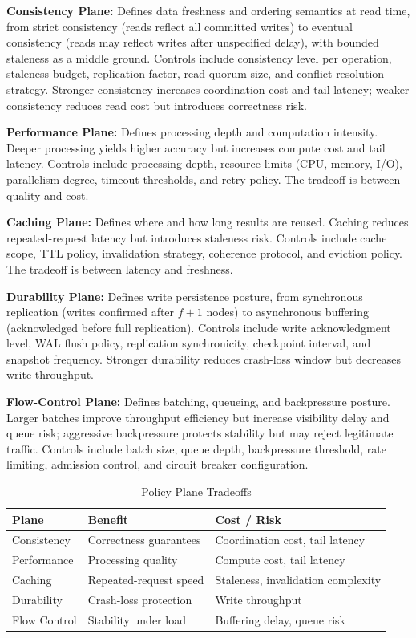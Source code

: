 \documentclass[conference]{IEEEtran}
\begin{document}
\textbf{Consistency Plane:} Defines data freshness and ordering semantics at read time, from strict consistency (reads reflect all committed writes) to eventual consistency (reads may reflect writes after unspecified delay), with bounded staleness as a middle ground. Controls include consistency level per operation, staleness budget, replication factor, read quorum size, and conflict resolution strategy. Stronger consistency increases coordination cost and tail latency; weaker consistency reduces read cost but introduces correctness risk.

\textbf{Performance Plane:} Defines processing depth and computation intensity. Deeper processing yields higher accuracy but increases compute cost and tail latency. Controls include processing depth, resource limits (CPU, memory, I/O), parallelism degree, timeout thresholds, and retry policy. The tradeoff is between quality and cost.

\textbf{Caching Plane:} Defines where and how long results are reused. Caching reduces repeated-request latency but introduces staleness risk. Controls include cache scope, TTL policy, invalidation strategy, coherence protocol, and eviction policy. The tradeoff is between latency and freshness.

\textbf{Durability Plane:} Defines write persistence posture, from synchronous replication (writes confirmed after $f+1$ nodes) to asynchronous buffering (acknowledged before full replication). Controls include write acknowledgment level, WAL flush policy, replication synchronicity, checkpoint interval, and snapshot frequency. Stronger durability reduces crash-loss window but decreases write throughput.

\textbf{Flow-Control Plane:} Defines batching, queueing, and backpressure posture. Larger batches improve throughput efficiency but increase visibility delay and queue risk; aggressive backpressure protects stability but may reject legitimate traffic. Controls include batch size, queue depth, backpressure threshold, rate limiting, admission control, and circuit breaker configuration.

\begin{table}[t]
\caption{Policy Plane Tradeoffs}
\label{tab:planes}
\centering
\small
\begin{tabular}{@{}l l l@{}}
\toprule
\textbf{Plane} & \textbf{Benefit} & \textbf{Cost / Risk} \\
\midrule
Consistency & Correctness guarantees & Coordination cost, tail latency \\
Performance & Processing quality & Compute cost, tail latency \\
Caching & Repeated-request speed & Staleness, invalidation complexity \\
Durability & Crash-loss protection & Write throughput \\
Flow Control & Stability under load & Buffering delay, queue risk \\
\bottomrule
\end{tabular}
\end{table}
\end{document}
